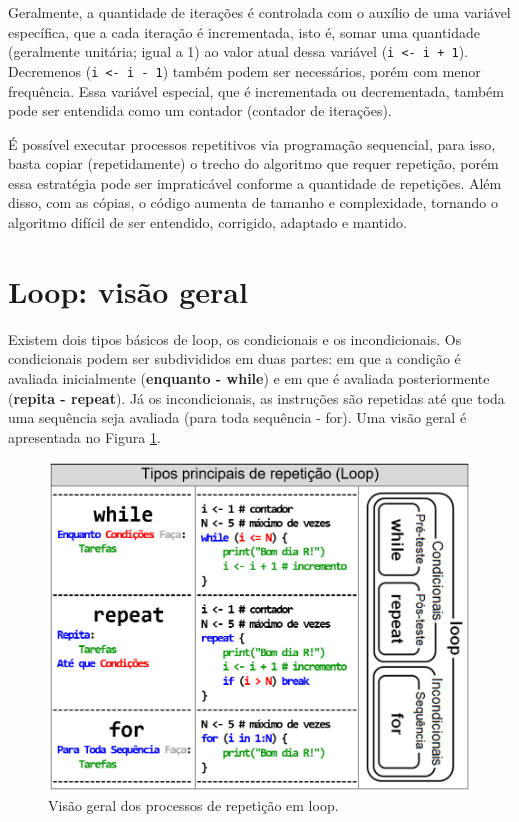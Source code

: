 \documentclass[
  11pt,
  a5paper,
  openany]{book}
\begin{document}
Geralmente, a quantidade de iterações é controlada com o auxílio de uma variável específica, que a cada iteração é incrementada, isto é, somar uma quantidade (geralmente unitária; igual a 1) ao valor atual dessa variável (\texttt{i\ \textless{}-\ i\ +\ 1}). Decremenos (\texttt{i\ \textless{}-\ i\ -\ 1}) também podem ser necessários, porém com menor frequência. Essa variável especial, que é incrementada ou decrementada, também pode ser entendida como um contador (contador de iterações).

É possível executar processos repetitivos via programação sequencial, para isso, basta copiar (repetidamente) o trecho do algoritmo que requer repetição, porém essa estratégia pode ser impraticável conforme a quantidade de repetições. Além disso, com as cópias, o código aumenta de tamanho e complexidade, tornando o algoritmo difícil de ser entendido, corrigido, adaptado e mantido.

\hypertarget{loop-visuxe3o-geral}{%
\section{Loop: visão geral}\label{loop-visuxe3o-geral}}

Existem dois tipos básicos de loop, os condicionais e os incondicionais. Os condicionais podem ser subdivididos em duas partes: em que a condição é avaliada inicialmente (\textbf{enquanto - while}) e em que é avaliada posteriormente (\textbf{repita - repeat}). Já os incondicionais, as instruções são repetidas até que toda uma sequência seja avaliada (para toda sequência - for). Uma visão geral é apresentada no Figura \ref{fig:FigRep1}.

\begin{figure}

{\centering \includegraphics[width=1\linewidth]{images/Fig_Rep1} 

}

\caption{Visão geral dos processos de repetição em loop.}\label{fig:FigRep1}
\end{figure}
\end{document}
